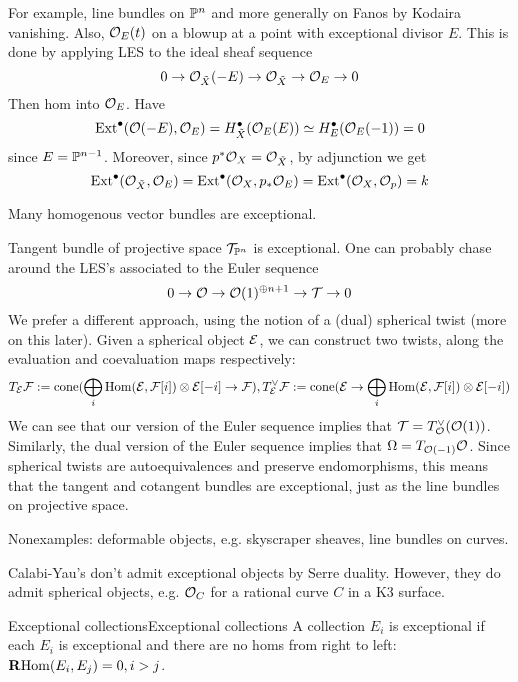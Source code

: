 For example, line bundles on $\P^n$ and more generally on Fanos by Kodaira vanishing. Also, $\O_{E}(t)$ on a blowup at a point with exceptional divisor $E$. This is done by applying LES to the ideal sheaf sequence $$0\to \O_{\tilde{X}} (-E)\to \O_{\tilde{X}}\to \O_{E}\to 0$$Then hom into $\O_{E}$. Have $$\Ext^\bullet(\O(-E), \O_{E})=H^\bullet_{\tilde{ X}} (\O_{E}(E))\simeq H^\bullet_{E} (\O_{E}(-1))=0$$since $E=\P^{n-1}$. Moreover, since $p^*\O_{X}=\O_{\tilde{X}}$, by adjunction we get $$\Ext^\bullet(\O_{\tilde{X}}, \O_E)=\Ext^\bullet(\O_X, p_*\O_E)=\Ext^\bullet(\O_X, \O_p)=k$$

Many homogenous vector bundles are exceptional.

\begin{example}{Tangent bundle of projective space}{}
    $\mathcal{T}_{\P^n}$ is exceptional. One can probably chase around the LES's associated to the Euler sequence $$0\rightarrow \O\rightarrow \O(1)^{\oplus n+1}\rightarrow \mathcal{T}\rightarrow 0$$
    We prefer a different approach, using the notion of a (dual) spherical twist (more on this later). Given a spherical object $\calE$, we can construct two twists, along the evaluation and coevaluation maps respectively: $$T_\calE\calF:=\cone(\bigoplus_i \Hom(\calE,\calF[i])\otimes \calE[-i]\rightarrow \calF), T^\vee_\calE\calF:=\cone(\calE\rightarrow \bigoplus_i \Hom(\calE,\calF[i])\otimes \calE[-i] )$$
    We can see that our version of the Euler sequence implies that $\mathcal{T}=T^\vee_\O(\O(1))$. Similarly, the dual version of the Euler sequence implies that $\Omega=T_{\O(-1)}\O$. Since spherical twists are autoequivalences and preserve endomorphisms, this means that the tangent and cotangent bundles are exceptional, just as the line bundles on projective space.
\end{example}

Nonexamples: deformable objects, e.g. skyscraper sheaves, line bundles on curves.

\begin{remark}{}{}
    Calabi-Yau's don't admit exceptional objects by Serre duality. However, they do admit spherical objects, e.g. $\O_C$ for a rational curve $C$ in a K3 surface.
\end{remark}

\begin{definition}{Exceptional collections}{Exceptional collections}
    A collection $E_i$ is exceptional if each $E_i$ is exceptional and there are no homs from right to left: $\RHom(E_{i}, E_{j})=0, i>j$.
\end{definition}

